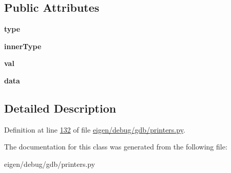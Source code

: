 \subsection*{Public Attributes}
\begin{DoxyCompactItemize}
\item 
\mbox{\label{classgdb_1_1printers_1_1_eigen_quaternion_printer_ab40b0ed521a160f47f5d147b7fd56c52}} 
{\bfseries type}
\item 
\mbox{\label{classgdb_1_1printers_1_1_eigen_quaternion_printer_a276cf42149fe814d518ae964c17318c9}} 
{\bfseries inner\+Type}
\item 
\mbox{\label{classgdb_1_1printers_1_1_eigen_quaternion_printer_a18d9023a370e6e94dd4fcd8d90c4727a}} 
{\bfseries val}
\item 
\mbox{\label{classgdb_1_1printers_1_1_eigen_quaternion_printer_a107dac2de48dd871a24e387ea8e4c081}} 
{\bfseries data}
\end{DoxyCompactItemize}


\subsection{Detailed Description}


Definition at line \hyperlink{eigen_2debug_2gdb_2printers_8py_source_l00132}{132} of file \hyperlink{eigen_2debug_2gdb_2printers_8py_source}{eigen/debug/gdb/printers.\+py}.



The documentation for this class was generated from the following file\+:\begin{DoxyCompactItemize}
\item 
eigen/debug/gdb/printers.\+py\end{DoxyCompactItemize}
